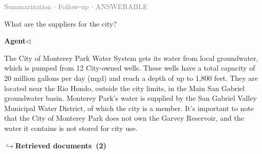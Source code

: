 \documentclass[a4paper,11pt]{article}
\begin{document}
\vspace{0.5em}
\hfill{\tiny\textcolor{gray}{Summarization $\cdot$ Follow-up $\cdot$ ANSWERABLE}}
\begin{userbubble}
What are the suppliers for the city?
\end{userbubble}
\noindent\hfill{\small\textcolor{agentcolor}{\textbf{Agent\enspace$\triangleleft$}}}
\begin{agentbubble}
The City of Monterey Park Water System gets its water from local groundwater, which is pumped from 12 City-owned wells. These wells have a total capacity of 20 million gallons per day (mgd) and reach a depth of up to 1,800 feet. They are located near the Rio Hondo, outside the city limits, in the Main San Gabriel groundwater basin. Monterey Park's water is supplied by the San Gabriel Valley Municipal Water District, of which the city is a member. It's important to note that the City of Monterey Park does not own the Garvey Reservoir, and the water it contains is not stored for city use.
\end{agentbubble}
\noindent\hfill{\footnotesize\textcolor{doccolor}{\textbf{$\hookrightarrow$\enspace Retrieved documents~(2)}}}
\end{document}
